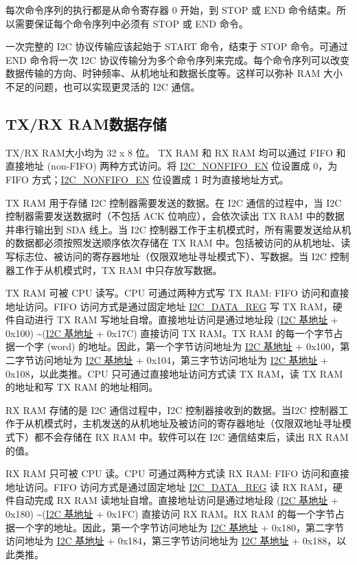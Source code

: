 \documentclass[main\_\_CN.tex]{subfiles}
\begin{document}
每次命令序列的执行都是从命令寄存器 0 开始，到 STOP 或 END 命令结束。所以需要保证每个命令序列中必须有 STOP 或 END 命令。

一次完整的 I2C 协议传输应该起始于 START 命令，结束于 STOP 命令。可通过 END 命令将一次 I2C 协议传输分为多个命令序列来完成。每个命令序列可以改变数据传输的方向、时钟频率、从机地址和数据长度等。这样可以弥补 RAM 大小不足的问题，也可以实现更灵活的 I2C 通信。

\subsection{TX/RX RAM数据存储}
\label{subsubsec:i2c-txrx}
TX/RX RAM大小均为 32 x 8 位。 TX RAM 和 RX RAM 均可以通过 FIFO 和直接地址 (non-FIFO) 两种方式访问。将 \hyperref[fielddesc:I2CNONFIFOEN]{I2C\_NONFIFO\_EN} 位设置成 0，为 FIFO 方式；\hyperref[fielddesc:I2CNONFIFOEN]{I2C\_NONFIFO\_EN} 位设置成 1 时为直接地址方式。

TX RAM 用于存储 I2C 控制器需要发送的数据。在 I2C 通信的过程中，当 I2C 控制器需要发送数据时（不包括 ACK 位响应），会依次读出 TX RAM 中的数据并串行输出到 SDA 线上。当 I2C 控制器工作于主机模式时，所有需要发送给从机的数据都必须按照发送顺序依次存储在 TX RAM 中。包括被访问的从机地址、读写标志位、被访问的寄存器地址（仅限双地址寻址模式下）、写数据。当 I2C 控制器工作于从机模式时，TX RAM 中只存放写数据。

TX RAM 可被 CPU 读写。CPU 可通过两种方式写 TX RAM: FIFO 访问和直接地址访问。FIFO 访问方式是通过固定地址 \hyperref[regdesc:I2CDATAREG]{I2C\_DATA\_REG} 写 TX RAM，硬件自动进行 TX RAM 写地址自增。直接地址访问是通过地址段 (\hyperref[tab:sysmem-base-address]{I2C 基地址} + 0x{}100) \textasciitilde (\hyperref[tab:sysmem-base-address]{I2C 基地址} + 0x{}17C) 直接访问 TX RAM。TX RAM 的每一个字节占据一个字 (word) 的地址。因此，第一个字节访问地址为 \hyperref[tab:sysmem-base-address]{I2C 基地址} + 0x{}100，第二字节访问地址为 \hyperref[tab:sysmem-base-address]{I2C 基地址} + 0x{}104，第三字节访问地址为 \hyperref[tab:sysmem-base-address]{I2C 基地址} + 0x{}108，以此类推。CPU 只可通过直接地址访问方式读 TX RAM，读 TX RAM 的地址和写 TX RAM 的地址相同。

RX RAM 存储的是 I2C 通信过程中，I2C 控制器接收到的数据。当I2C 控制器工作于从机模式时，主机发送的从机地址及被访问的寄存器地址（仅限双地址寻址模式下）都不会存储在 RX RAM 中。软件可以在 I2C 通信结束后，读出 RX RAM 的值。


RX RAM 只可被 CPU 读。CPU 可通过两种方式读 RX RAM: FIFO 访问和直接地址访问。FIFO 访问方式是通过固定地址 \hyperref[regdesc:I2CDATAREG]{I2C\_DATA\_REG} 读 RX RAM，硬件自动完成 RX RAM 读地址自增。直接地址访问是通过地址段 (\hyperref[tab:sysmem-base-address]{I2C 基地址} + 0x{}180) \textasciitilde (\hyperref[tab:sysmem-base-address]{I2C 基地址} + 0x{}1FC) 直接访问 RX RAM。RX RAM 的每一个字节占据一个字的地址。因此，第一个字节访问地址为 \hyperref[tab:sysmem-base-address]{I2C 基地址} + 0x{}180，第二字节访问地址为 \hyperref[tab:sysmem-base-address]{I2C 基地址} + 0x{}184，第三字节访问地址为 \hyperref[tab:sysmem-base-address]{I2C 基地址} + 0x{}188，以此类推。
\end{document}
